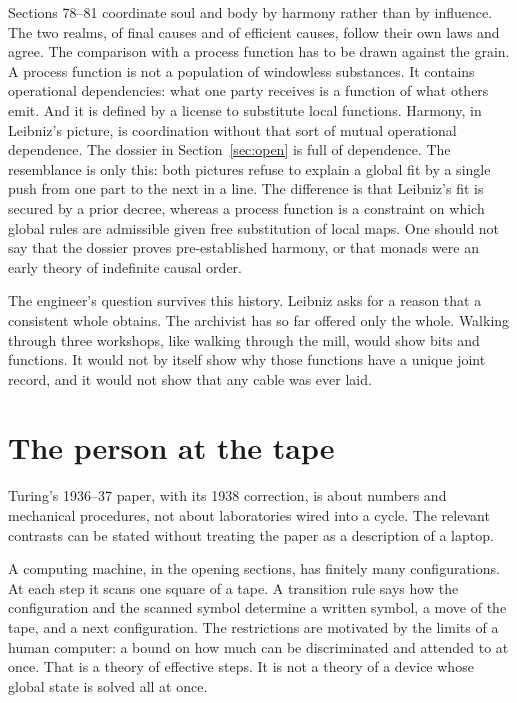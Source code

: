 \documentclass[11pt]{article}
\begin{document}
Sections 78--81 coordinate soul and body by harmony rather than by influence. The two realms, of final causes and of efficient causes, follow their own laws and agree. The comparison with a process function has to be drawn against the grain. A process function is not a population of windowless substances. It contains operational dependencies: what one party receives is a function of what others emit. And it is defined by a license to substitute local functions. Harmony, in Leibniz’s picture, is coordination without that sort of mutual operational dependence. The dossier in Section~\ref{sec:open} is full of dependence. The resemblance is only this: both pictures refuse to explain a global fit by a single push from one part to the next in a line. The difference is that Leibniz’s fit is secured by a prior decree, whereas a process function is a constraint on which global rules are admissible given free substitution of local maps. One should not say that the dossier proves pre-established harmony, or that monads were an early theory of indefinite causal order.

The engineer’s question survives this history. Leibniz asks for a reason that a consistent whole obtains. The archivist has so far offered only the whole. Walking through three workshops, like walking through the mill, would show bits and functions. It would not by itself show why those functions have a unique joint record, and it would not show that any cable was ever laid.

\section{The person at the tape}
\label{sec:turing}

Turing’s 1936--37 paper, with its 1938 correction, is about numbers and mechanical procedures, not about laboratories wired into a cycle. The relevant contrasts can be stated without treating the paper as a description of a laptop.

A computing machine, in the opening sections, has finitely many configurations. At each step it scans one square of a tape. A transition rule says how the configuration and the scanned symbol determine a written symbol, a move of the tape, and a next configuration. The restrictions are motivated by the limits of a human computer: a bound on how much can be discriminated and attended to at once. That is a theory of effective steps. It is not a theory of a device whose global state is solved all at once.
\end{document}
